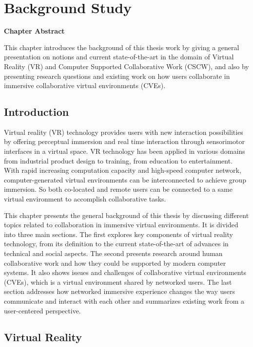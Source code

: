 \chapter{Background Study}
\label{chapter:context}
\pagebreak

\textbf{Chapter Abstract}

This chapter introduces the background of this thesis work by giving a general presentation on notions and current state-of-the-art in the domain of Virtual Reality (VR) and Computer Supported Collaborative Work (CSCW), and also by presenting research questions and existing work on how users collaborate in immersive collaborative virtual environments (CVEs).

\vspace*{2\baselineskip}

\minitoc

\newpage
\section{Introduction}
Virtual reality (VR) technology provides users with new interaction possibilities by offering perceptual immersion and real time interaction through sensorimotor interfaces in a virtual space. VR technology has been applied in various domains from industrial product design to training, from education to entertainment. With rapid increasing computation capacity and high-speed computer network, computer-generated virtual environments can be interconnected to achieve group immersion. So both co-located and remote users can be connected to a same virtual environment to accomplish collaborative tasks.
 
This chapter presents the general background of this thesis by discussing different topics related to collaboration in immersive virtual environments. It is divided into three main sections. The first explores key components of virtual reality technology, from its definition to the current state-of-the-art of advances in technical and social aspects. The second presents research around human collaborative work and how they could be supported by modern computer systems. It also shows issues and challenges of collaborative virtual environments (CVEs), which is a virtual environment shared by networked users. The last section addresses how networked immersive experience changes the way users communicate and interact with each other and summarizes existing work from a user-centered perspective.


\section{Virtual Reality}
